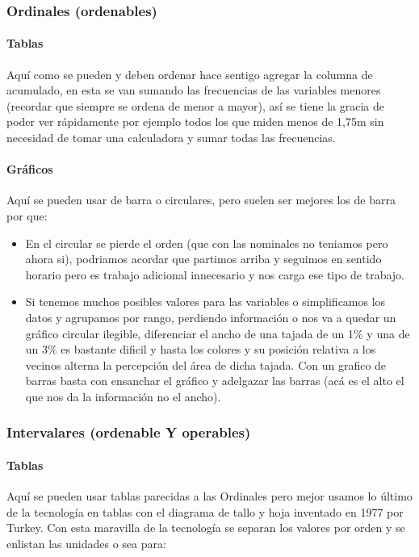 \documentclass[letterpaper,10pt,openany,oneside]{sphinxmanual}
\begin{document}
\subsubsection{Ordinales (ordenables)}
\label{Estadistica_Descriptiva:ordinales-ordenables}

\paragraph{Tablas}
\label{Estadistica_Descriptiva:id1}
Aquí como se pueden y deben ordenar hace sentigo agregar la columna de acumulado, en esta
se van sumando las frecuencias de las variables menores (recordar que siempre se ordena de
menor a mayor), así se tiene la gracia de poder ver rápidamente por ejemplo todos los que
miden menos de 1,75m sin necesidad de tomar una calculadora y sumar todas las frecuencias.


\paragraph{Gráficos}
\label{Estadistica_Descriptiva:id2}
Aquí se pueden usar de barra o circulares, pero suelen ser mejores los de barra por que:
\begin{itemize}
\item {} 
En el circular se pierde el orden (que con las nominales no teniamos pero ahora si),
podriamos acordar que partimos arriba y seguimos en sentido horario pero es trabajo
adicional innecesario y nos carga ese tipo de trabajo.

\item {} 
Si tenemos muchos posibles valores para las variables o simplificamos los datos y
agrupamos por rango, perdiendo información o nos va a quedar un gráfico circular ilegible,
diferenciar el ancho de una tajada de un 1\% y una de un 3\% es bastante dificil y hasta los
colores y su posición relativa a los vecinos alterna la percepción del área de dicha
tajada. Con un grafico de barras basta con ensanchar el gráfico y adelgazar las barras
(acá es el alto el que nos da la información no el ancho).

\end{itemize}


\subsubsection{Intervalares (ordenable Y operables)}
\label{Estadistica_Descriptiva:intervalares-ordenable-y-operables}

\paragraph{Tablas}
\label{Estadistica_Descriptiva:id3}
Aquí se pueden usar tablas parecidas a las Ordinales pero mejor usamos lo último de la
tecnología en tablas con el diagrama de tallo y hoja inventado en 1977 por Turkey. Con
esta maravilla de la tecnología se separan los valores por orden y se enlistan las
unidades o sea para:
\end{document}
